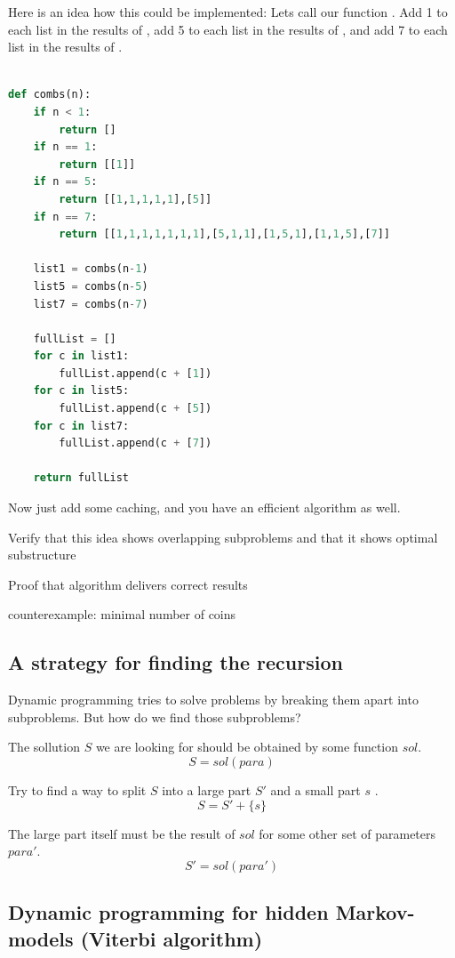 Here is an idea how this could be implemented: 
Lets call our function .
Add 1 to each list in the results of ,
add 5 to each list in the results of , 
and add 7 to each list in the results of .


\begin{lstlisting}[language=python]

def combs(n):
	if n < 1:
		return []
	if n == 1:
		return [[1]]
	if n == 5:
		return [[1,1,1,1,1],[5]]
	if n == 7:
		return [[1,1,1,1,1,1,1],[5,1,1],[1,5,1],[1,1,5],[7]]

	list1 = combs(n-1)
	list5 = combs(n-5)
	list7 = combs(n-7)

	fullList = []
	for c in list1:
		fullList.append(c + [1])
	for c in list5:
		fullList.append(c + [5])
	for c in list7: 
		fullList.append(c + [7])

	return fullList

\end{lstlisting}

Now just add some caching, and you have an efficient algorithm as well. 

Verify that this idea shows overlapping subproblems
and that it shows optimal substructure

Proof that algorithm delivers correct results


counterexample: minimal number of coins


\subsection{A strategy for finding the recursion}

Dynamic programming tries to solve problems by breaking them apart into subproblems. But how do we find those subproblems?

The sollution $S$ we are looking for should be obtained by some function $sol$.
$$ S = sol(para) $$

Try to find a way to split $S$ into a large part $S'$ and a small part $s$ .
$$ S = S' + \{ s \} $$

The large part itself must be the result of $sol$ for some other set of parameters $para'$.
$$ S' = sol(para') $$


\subsection{Dynamic programming for hidden Markov-models (Viterbi algorithm)}

